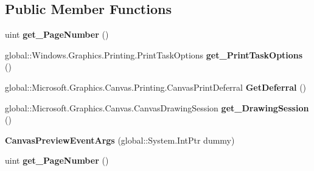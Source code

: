 \subsection*{Public Member Functions}
\begin{DoxyCompactItemize}
\item 
\mbox{\label{class_microsoft_1_1_graphics_1_1_canvas_1_1_printing_1_1_canvas_preview_event_args_ae09b4efa9f3c47599cc48d99dc8f71f2}} 
uint {\bfseries get\+\_\+\+Page\+Number} ()
\item 
\mbox{\label{class_microsoft_1_1_graphics_1_1_canvas_1_1_printing_1_1_canvas_preview_event_args_a62407eb61c4c702e3649d979f1eda285}} 
global\+::\+Windows.\+Graphics.\+Printing.\+Print\+Task\+Options {\bfseries get\+\_\+\+Print\+Task\+Options} ()
\item 
\mbox{\label{class_microsoft_1_1_graphics_1_1_canvas_1_1_printing_1_1_canvas_preview_event_args_a877d99bbaa60578acf4e13109782c656}} 
global\+::\+Microsoft.\+Graphics.\+Canvas.\+Printing.\+Canvas\+Print\+Deferral {\bfseries Get\+Deferral} ()
\item 
\mbox{\label{class_microsoft_1_1_graphics_1_1_canvas_1_1_printing_1_1_canvas_preview_event_args_afa5a185414d95a547b3b8d6de45864d6}} 
global\+::\+Microsoft.\+Graphics.\+Canvas.\+Canvas\+Drawing\+Session {\bfseries get\+\_\+\+Drawing\+Session} ()
\item 
\mbox{\label{class_microsoft_1_1_graphics_1_1_canvas_1_1_printing_1_1_canvas_preview_event_args_adfb508d68950ca5e6aba4bcb1b16375d}} 
{\bfseries Canvas\+Preview\+Event\+Args} (global\+::\+System.\+Int\+Ptr dummy)
\item 
\mbox{\label{class_microsoft_1_1_graphics_1_1_canvas_1_1_printing_1_1_canvas_preview_event_args_ae09b4efa9f3c47599cc48d99dc8f71f2}} 
uint {\bfseries get\+\_\+\+Page\+Number} ()

\end{DoxyCompactItemize}

